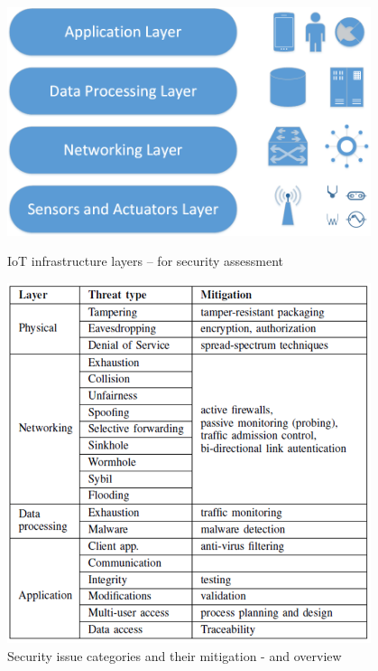 \documentclass[a4paper]{article}
\begin{document}
\begin{figure}[H]
    \begin{minipage}{0.48\textwidth}
     \centering
     \includegraphics[width=0.95\textwidth]{figures/IoT_Layers.png}
     \caption{IoT infrastructure layers -- for security assessment \cite{IoT_Security}}
     \label{fig:IoT_Layers}
    \end{minipage}\hfill    
    \begin{minipage}{0.48\textwidth}
     \centering
     \includegraphics[width=0.95\textwidth]{figures/IoT_Security_Layer_Table.png}
     \caption{Security issue categories and their mitigation - and overview \cite{IoT_Security}}
     \label{fig:IoT_Table}
    \end{minipage}\hfill
\end{figure}
\end{document}
